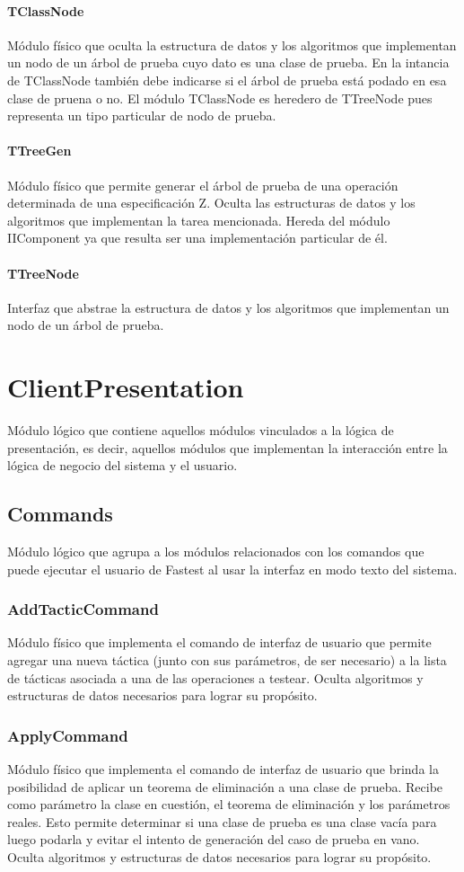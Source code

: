 \documentclass[a4paper,10pt]{report}
\begin{document}
				\paragraph{TClassNode}
				Módulo físico que oculta la estructura de datos y los algoritmos que implementan un nodo de un árbol de prueba cuyo dato es una clase de prueba. En la intancia de TClassNode también debe indicarse si el árbol de prueba está podado en esa clase de pruena o no. El módulo TClassNode es heredero de TTreeNode pues representa un tipo particular de nodo de prueba.
				\paragraph{TTreeGen}
				Módulo físico que permite generar el árbol de prueba de una operación determinada de una especificación Z. Oculta las estructuras de datos y los algoritmos que implementan la tarea mencionada. Hereda del módulo IIComponent ya que resulta ser una implementación particular de él.
				\paragraph{TTreeNode}
				Interfaz que abstrae la estructura de datos y los algoritmos que implementan un nodo de un árbol de prueba.

	\section{ClientPresentation}
	Módulo lógico que contiene aquellos módulos vinculados a la lógica de presentación, es decir, aquellos módulos que implementan la interacción entre la lógica de negocio del sistema y el usuario.
		\subsection{Commands}
		Módulo lógico que agrupa a los módulos relacionados con los comandos que puede ejecutar el usuario de Fastest al usar la interfaz en modo texto del sistema.
			\subsubsection{AddTacticCommand}
			Módulo físico que implementa el comando de interfaz de usuario que permite agregar una nueva táctica (junto con sus parámetros, de ser necesario) a la lista de tácticas asociada a una de las operaciones a testear. Oculta algoritmos y estructuras de datos necesarios para lograr su propósito.
			\subsubsection{ApplyCommand}
			Módulo físico que implementa el comando de interfaz de usuario que brinda la posibilidad de aplicar un teorema de eliminación a una clase de prueba. Recibe como parámetro la clase en cuestión, el teorema de eliminación y los parámetros reales. Esto permite determinar si una clase de prueba es una clase vacía para luego podarla y evitar el intento de generación del caso de prueba en vano. Oculta algoritmos y estructuras de datos necesarios para lograr su propósito.
\end{document}
